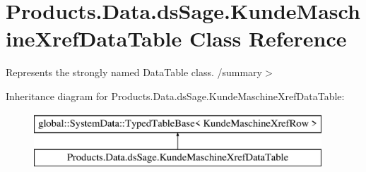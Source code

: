\hypertarget{class_products_1_1_data_1_1ds_sage_1_1_kunde_maschine_xref_data_table}{}\section{Products.\+Data.\+ds\+Sage.\+Kunde\+Maschine\+Xref\+Data\+Table Class Reference}
\label{class_products_1_1_data_1_1ds_sage_1_1_kunde_maschine_xref_data_table}


Represents the strongly named Data\+Table class. /summary$>$  


Inheritance diagram for Products.\+Data.\+ds\+Sage.\+Kunde\+Maschine\+Xref\+Data\+Table\+:\begin{figure}[H]
\begin{center}
\leavevmode
\includegraphics[height=2.000000cm]{class_products_1_1_data_1_1ds_sage_1_1_kunde_maschine_xref_data_table}
\end{center}
\end{figure}
